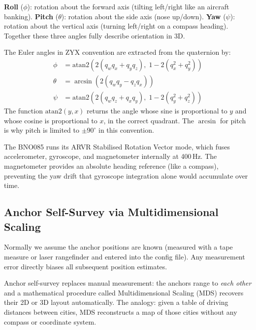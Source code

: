 \documentclass[11pt,a4paper]{article}
\begin{document}
\begin{intubox}
\textbf{Roll} ($\phi$): rotation about the forward axis (tilting left/right like an aircraft banking). \textbf{Pitch} ($\theta$): rotation about the side axis (nose up/down). \textbf{Yaw} ($\psi$): rotation about the vertical axis (turning left/right on a compass heading). Together these three angles fully describe orientation in 3D.
\end{intubox}

The Euler angles in ZYX convention are extracted from the quaternion by:
\begin{align}
\phi   &= \text{atan2}\!\left(2(q_w q_x + q_y q_z),\; 1 - 2(q_x^2 + q_y^2)\right) \label{eq:roll}\\
\theta &= \arcsin\!\left(2(q_w q_y - q_z q_x)\right) \label{eq:pitch}\\
\psi   &= \text{atan2}\!\left(2(q_w q_z + q_x q_y),\; 1 - 2(q_y^2 + q_z^2)\right) \label{eq:yaw}
\end{align}
The function $\text{atan2}(y,x)$ returns the angle whose sine is proportional to $y$ and whose cosine is proportional to $x$, in the correct quadrant. The $\arcsin$ for pitch is why pitch is limited to $\pm90^\circ$ in this convention.

The BNO085 runs its ARVR Stabilised Rotation Vector mode, which fuses accelerometer, gyroscope, and magnetometer internally at 400\,Hz. The magnetometer provides an absolute heading reference (like a compass), preventing the yaw drift that gyroscope integration alone would accumulate over time.

\subsection{Anchor Self-Survey via Multidimensional Scaling}

\begin{intubox}
Normally we assume the anchor positions are known (measured with a tape measure or laser rangefinder and entered into the config file). Any measurement error directly biases all subsequent position estimates.

Anchor self-survey replaces manual measurement: the anchors range to \emph{each other} and a mathematical procedure called Multidimensional Scaling (MDS) recovers their 2D or 3D layout automatically. The analogy: given a table of driving distances between cities, MDS reconstructs a map of those cities without any compass or coordinate system.
\end{intubox}
\end{document}
